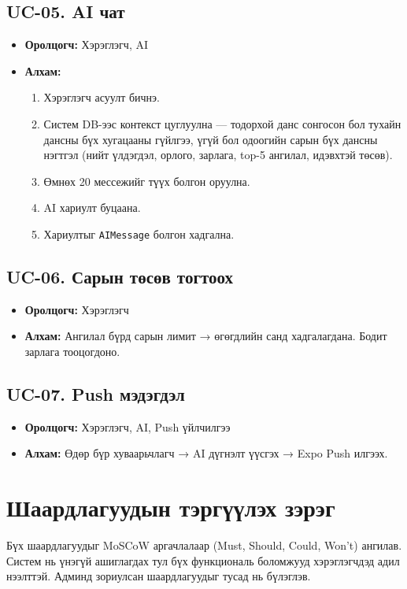 \subsection{UC-05. AI чат}
\begin{itemize}
    \item \textbf{Оролцогч:} Хэрэглэгч, AI
    \item \textbf{Алхам:}
    \begin{enumerate}
        \item Хэрэглэгч асуулт бичнэ.
        \item Систем DB-ээс контекст цуглуулна --- тодорхой данс сонгосон бол тухайн дансны бүх хугацааны гүйлгээ, үгүй бол одоогийн сарын бүх дансны нэгтгэл (нийт үлдэгдэл, орлого, зарлага, top-5 ангилал, идэвхтэй төсөв).
        \item Өмнөх 20 мессежийг түүх болгон оруулна.
        \item AI хариулт буцаана.
        \item Хариултыг \texttt{AIMessage} болгон хадгална.
    \end{enumerate}
\end{itemize}

\subsection{UC-06. Сарын төсөв тогтоох}
\begin{itemize}
    \item \textbf{Оролцогч:} Хэрэглэгч
    \item \textbf{Алхам:} Ангилал бүрд сарын лимит → өгөгдлийн санд хадгалагдана. Бодит зарлага тооцогдоно.
\end{itemize}

\subsection{UC-07. Push мэдэгдэл}
\begin{itemize}
    \item \textbf{Оролцогч:} Хэрэглэгч, AI, Push үйлчилгээ
    \item \textbf{Алхам:} Өдөр бүр хуваарьчлагч → AI дүгнэлт үүсгэх → Expo Push илгээх.
\end{itemize}

\section{Шаардлагуудын тэргүүлэх зэрэг}
Бүх шаардлагуудыг MoSCoW аргачлалаар (Must, Should, Could, Won't) ангилав. Систем нь үнэгүй ашиглагдах тул бүх функциональ боломжууд хэрэглэгчдэд адил нээлттэй. Админд зориулсан шаардлагуудыг тусад нь бүлэглэв.

